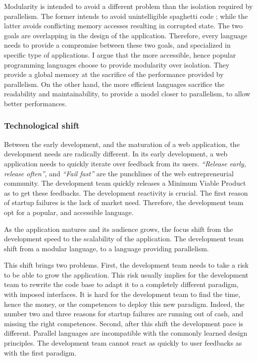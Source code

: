 Modularity is intended to avoid a different problem than the isolation required by parallelism.
The former intends to avoid unintelligible spaghetti code ; while the latter avoids conflicting memory accesses resulting in corrupted state.
The two goals are overlapping in the design of the application.
Therefore, every language needs to provide a compromise between these two goals, and specialized in specific type of applications.
I argue that the more accessible, hence popular programming languages choose to provide modularity over isolation.
They provide a global memory at the sacrifice of the performance provided by parallelism.
On the other hand, the more efficient languages sacrifice the readability and maintainability, to provide a model closer to parallelism, to allow better performances.


\subsubsection{Technological shift}

Between the early development, and the maturation of a web application, the development needs are radically different.
In its early development, a web application needs to quickly iterate over feedback from its users.
\textit{``Release early, release often''}, and \textit{``Fail fast''} are the punchlines of the web entrepreneurial community.
The development team quickly releases a Minimum Viable Product as to get these feedbacks.
The development reactivity is crucial.
The first reason of startup failures is the lack of market need.
Therefore, the development team opt for a popular, and accessible language.

As the application matures and its audience grows, the focus shift from the development speed to the scalability of the application.
The development team shift from a modular language, to a language providing parallelism.


This shift brings two problems.
First, the development team needs to take a risk to be able to grow the application.
This risk usually implies for the development team to rewrite the code base to adapt it to a completely different paradigm, with imposed interfaces.
It is hard for the development team to find the time, hence the money, or the competences to deploy this new paradigm.
Indeed, the number two and three reasons for startup failures are running out of cash, and missing the right competences.
Second, after this shift the development pace is different.
Parallel languages are incompatible with the commonly learned design principles.
The development team cannot react as quickly to user feedbacks as with the first paradigm.

